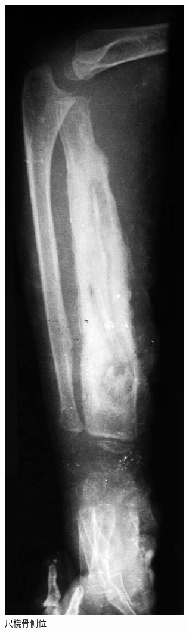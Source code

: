 \begin{figure}[!htbp]
 \centering
 \includegraphics{./images/Image00072.jpg}
 \captionsetup{justification=centering}
 \caption{尺桡骨侧位}
 \label{fig2-5-2}
  \end{figure} 

